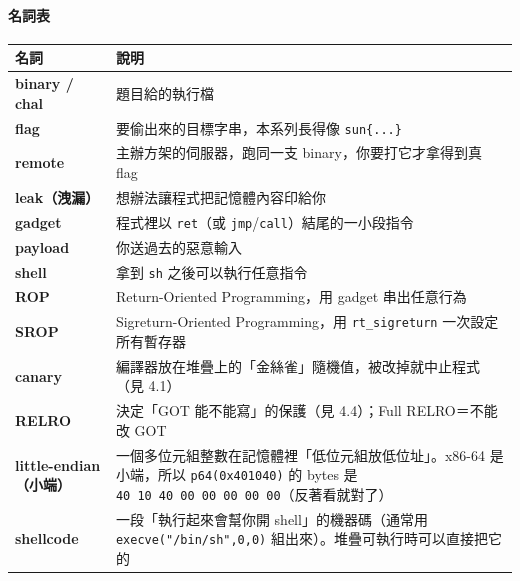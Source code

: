 \documentclass[10pt,a4paper]{article}
\newcounter{none}
\begin{document}
\paragraph{名詞表}\label{ux540dux8a5eux8868}

{\def\LTcaptype{none} %
\begin{longtable}[]{@{}
  >{\raggedright\arraybackslash}p{}
  >{\raggedright\arraybackslash}p{}@{}}
\toprule\noalign{}
\begin{minipage}[b]{\linewidth}\raggedright
名詞
\end{minipage} & \begin{minipage}[b]{\linewidth}\raggedright
說明
\end{minipage} \\
\midrule\noalign{}
\endhead
\bottomrule\noalign{}
\endlastfoot
\textbf{binary / chal} & 題目給的執行檔 \\
\textbf{flag} & 要偷出來的目標字串，本系列長得像 \texttt{sun\{\allowbreak{}...\allowbreak{}\}\allowbreak{}} \\
\textbf{remote} & 主辦方架的伺服器，跑同一支 binary，你要打它才拿得到真
flag \\
\textbf{leak（洩漏）} & 想辦法讓程式把記憶體內容印給你 \\
\textbf{gadget} & 程式裡以 \texttt{ret}（或
\texttt{jmp}/\texttt{call}）結尾的一小段指令 \\
\textbf{payload} & 你送過去的惡意輸入 \\
\textbf{shell} & 拿到 \texttt{sh} 之後可以執行任意指令 \\
\textbf{ROP} & Return-Oriented Programming，用 gadget 串出任意行為 \\
\textbf{SROP} & Sigreturn-Oriented Programming，用
\texttt{rt\_\allowbreak{}sigreturn} 一次設定所有暫存器 \\
\textbf{canary} &
編譯器放在堆疊上的「金絲雀」隨機值，被改掉就中止程式（見 4.1） \\
\textbf{RELRO} & 決定「GOT 能不能寫」的保護（見 4.4）；Full
RELRO＝不能改 GOT \\
\textbf{little-endian（小端）} &
一個多位元組整數在記憶體裡「低位元組放低位址」。x86-64 是小端，所以
\texttt{p64(0x401040)} 的 bytes 是
\texttt{40\ \allowbreak{}10\ \allowbreak{}40\ \allowbreak{}00\ \allowbreak{}00\ \allowbreak{}00\ \allowbreak{}00\ \allowbreak{}00}（反著看就對了） \\
\textbf{shellcode} & 一段「執行起來會幫你開 shell」的機器碼（通常用
\texttt{execve("/\allowbreak{}bin/\allowbreak{}sh",\allowbreak{}0,\allowbreak{}0)} 組出來）。堆疊可執行時可以直接把它的

\end{longtable}}
\end{document}

